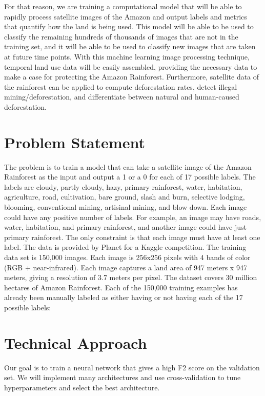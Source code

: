 \documentclass[10pt,twocolumn,letterpaper]{article}
\begin{document}
For that reason, we are training a computational model that will be able to rapidly process satellite images of the Amazon and output labels and metrics that quantify how the land is being used. This model will be able to be used to classify the remaining hundreds of thousands of images that are not in the training set, and it will be able to be used to classify new images that are taken at future time points. With this machine learning image processing technique, temporal land use data will be easily assembled, providing the necessary data to make a case for protecting the Amazon Rainforest. Furthermore, satellite data of the rainforest can be applied to compute deforestation rates, detect illegal mining/deforestation, and differentiate between natural and human-caused deforestation.


\section{Problem Statement}
The problem is to train a model that can take a satellite image of the Amazon Rainforest as the input and output a 1 or a 0 for each of 17 possible labels. The labels are cloudy, partly cloudy, hazy, primary rainforest, water, habitation, agriculture, road, cultivation, bare ground, slash and burn, selective lodging, blooming, conventional mining, artisinal mining, and blow down. Each image could have any positive number of labels. For example, an image may have roads, water, habitation, and primary rainforest, and another image could have just primary rainforest. The only constraint is that each image must have at least one label. The data is provided by Planet for a Kaggle competition\cite{Kaggle}. The training data set is 150,000 images. Each image is 256x256 pixels with 4 bands of color (RGB + near-infrared). Each image captures a land area of 947 meters x 947 meters, giving a resolution of 3.7 meters per pixel. The dataset covers 30 million hectares of Amazon Rainforest. Each of the 150,000 training examples has already been manually labeled as either having or not having each of the 17 possible labels: 


\section{Technical Approach}
Our goal is to train a neural network that gives a high F2 score on the validation set. We will implement many architectures and use cross-validation to tune hyperparameters and select the best architecture.
\end{document}
